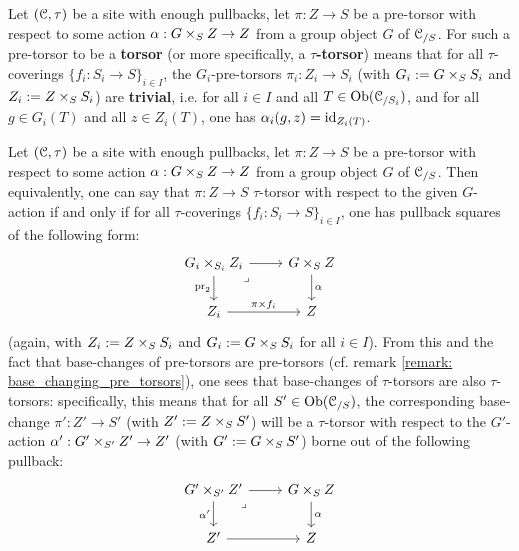             \begin{definition}[Torsors] \label{def: torsors}
                Let $(\mathcal{C}, \tau)$ be a site with enough pullbacks, let $\pi: Z \to S$ be a pre-torsor with respect to some action $\alpha: G \x_S Z \to Z$ from a group object $G$ of $\mathcal{C}_{/S}$. For such a pre-torsor to be a \textbf{torsor} (or more specifically, a \textbf{$\tau$-torsor}) means that for all $\tau$-coverings $\{f_i: S_i \to S\}_{i \in I}$, the $G_i$-pre-torsors $\pi_i: Z_i \to S_i$ (with $G_i := G \x_S S_i$ and $Z_i := Z \x_S S_i$) are \textbf{trivial}, i.e. for all $i \in I$ and all $T \in \mathrm{Ob}(\mathcal{C}_{/S_i})$, and for all $g \in G_i(T)$ and all $z \in Z_i(T)$, one has $\alpha_i(g, z) = \mathrm{id}_{Z_i(T)}$.
            \end{definition}
            \begin{remark} \label{remark: base_changing_torsors}
                Let $(\mathcal{C}, \tau)$ be a site with enough pullbacks, let $\pi: Z \to S$ be a pre-torsor with respect to some action $\alpha: G \x_S Z \to Z$ from a group object $G$ of $\mathcal{C}_{/S}$. Then equivalently, one can say that $\pi: Z \to S$ $\tau$-torsor with respect to the given $G$-action if and only if for all $\tau$-coverings $\{f_i: S_i \to S\}_{i \in I}$, one has pullback squares of the following form:
                    $$
                        \begin{tikzcd}
                        	{G_i \x_{S_i} Z_i} & {G \x_S Z} \\
                        	{Z_i} & Z
                        	\arrow["\alpha", from=1-2, to=2-2]
                        	\arrow["{\pi \x f_i}", from=2-1, to=2-2]
                        	\arrow["{\pr_2}"', from=1-1, to=2-1]
                        	\arrow[from=1-1, to=1-2]
                        	\arrow["\lrcorner"{anchor=center, pos=0.125}, draw=none, from=1-1, to=2-2]
                        \end{tikzcd}
                    $$
                (again, with $Z_i := Z \x_S S_i$ and $G_i := G \x_S S_i$ for all $i \in I$). From this and the fact that base-changes of pre-torsors are pre-torsors (cf. remark \ref{remark: base_changing_pre_torsors}), one sees that base-changes of $\tau$-torsors are also $\tau$-torsors: specifically, this means that for all $S' \in \mathrm{Ob}(\mathcal{C}_{/S})$, the corresponding base-change $\pi': Z' \to S'$ (with $Z' := Z \x_S S'$) will be a $\tau$-torsor with respect to the $G'$-action $\alpha': G' \x_{S'} Z' \to Z'$ (with $G' := G \x_S S'$) borne out of the following pullback:
                    $$
                        \begin{tikzcd}
                        	{G' \x_{S'} Z'} & {G \x_S Z} \\
                        	{Z'} & Z
                        	\arrow["\alpha", from=1-2, to=2-2]
                        	\arrow[from=1-1, to=1-2]
                        	\arrow["\lrcorner"{anchor=center, pos=0.125}, draw=none, from=1-1, to=2-2]
                        	\arrow[from=2-1, to=2-2]
                        	\arrow["{\alpha'}"', from=1-1, to=2-1]
                        \end{tikzcd}
                    $$
            \end{remark}
